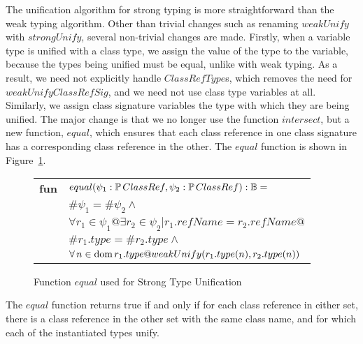 The unification algorithm for strong typing is more straightforward
than the weak typing algorithm. Other than trivial changes such as
renaming $weakUnify$ with $strongUnify$, several non-trivial changes
are made. Firstly, when a variable type is unified with a class type,
we assign the value of the type to the variable, because the types
being unified must be equal, unlike with weak typing. As a result, we
need not explicitly handle $ClassRefType$s, which removes the need for
$weakUnifyClassRefSig$, and we need not use class type variables at
all. Similarly, we assign class signature variables the type with
which they are being unified. The major change is that we no longer
use the function $intersect$, but a new function, $equal$, which
ensures that each class reference in one class signature has a
corresponding class reference in the other. The $equal$ function is
shown in Figure~\ref{equal-classref}.

\begin{figure}[t]
\begin{tabular}{ll}
  {\bf fun} & $equal(\psi_1:\power ClassRef, \psi_2:\power ClassRef) : \bool =$\\
   & \quad\quad$\#\psi_1 = \#\psi_2 \land$\\
   & \quad\quad$\forall r_1 \in \psi_1 @ \exists r_2 \in \psi_2 | r_1.refName = r_2.refName @$\\
   & \quad\quad\quad\quad $\#r_1.type = \#r_2.type \land$\\
   & \quad\quad\quad\quad $\forall n \in \dom r_1.type @
       weakUnify(r_1.type(n), r_2.type(n))$
\end{tabular}
\caption{Function $equal$ used for Strong Type Unification}
\label{equal-classref}
\end{figure}

The $equal$ function returns true if and only if for each class
reference in either set, there is a class reference in the other set
with the same class name, and for which each of the instantiated types
unify.

